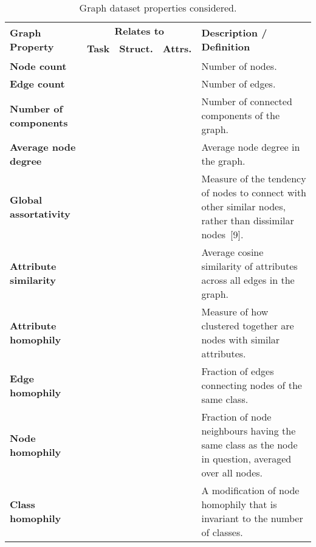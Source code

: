 \begin{table*}
	\caption{Graph dataset properties considered.}
	\label{tab:graph-properties}
	\centering
	\begin{tabularx}{\linewidth}{XcccX}
		\toprule
		\multirow{2}{*}{\textbf{Graph Property}}           & \multicolumn{3}{c}{\textbf{Relates to}}                   & \multirow{2}{*}{\textbf{Description / Definition}} \\
		\cmidrule(lr){2-4}
		                                                   & \textbf{Task} & \textbf{Struct.} & \textbf{Attrs.} & \\
		\midrule
		\textbf{Node count}                                & \crossmark    & \crossmark         & \crossmark          & Number of nodes. \\
		\textbf{Edge count}                                & \crossmark    & \crossmark         & \crossmark          & Number of edges. \\
		\textbf{Number of components}                      & \crossmark    & \checkmark         & \crossmark          & Number of connected components of the graph. \\
		\textbf{Average node degree}                       & \crossmark    & \checkmark         & \crossmark          & Average node degree in the graph. \\
		\textbf{Global assortativity}                      & \crossmark    & \checkmark         & \crossmark          & Measure of the tendency of nodes to connect with other similar nodes, rather than dissimilar nodes~[9]. \\
		\textbf{Attribute similarity}                      & \crossmark    & \checkmark         & \checkmark          & Average cosine similarity of attributes across all edges in the graph. \\
		\textbf{Attribute homophily}                       & \checkmark    & \checkmark         & \crossmark          & Measure of how clustered together are nodes with similar attributes. \\
		\textbf{Edge homophily}                            & \checkmark    & \checkmark         & \crossmark          & Fraction of edges connecting nodes of the same class. \\
		\textbf{Node homophily}                            & \checkmark    & \checkmark         & \crossmark          & Fraction of node neighbours having the same class as the node in question, averaged over all nodes. \\
		\textbf{Class homophily}                           & \checkmark    & \checkmark         & \crossmark          & A modification of node homophily that is invariant to the number of classes. \\

\end{tabularx}
\end{table*}
